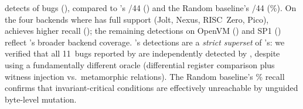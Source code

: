 \begin{table}[t]
\caption{Bug detection effectiveness across six zkVM backends. \textbf{Det.}: bugs detected; \textbf{Rec.}: recall; \textbf{TTF}: median time to first bug. \tool's detections are a strict superset of \arguzz's.}
\label{tbl:effectiveness}
\centering
{}
\end{table}

\tool detects  of  bugs (), compared to \arguzz's /44 () and the Random baseline's /44 (\%). On the four backends where \arguzz has full support (Jolt, Nexus, RISC~Zero, Pico), \tool achieves \tbd{$1.5\times$} higher recall (); the remaining detections on OpenVM () and SP1 () reflect \tool's broader backend coverage. \tool's detections are a \emph{strict superset} of \arguzz's: we verified that all 11~bugs reported by \arguzz are independently detected by \tool, despite using a fundamentally different oracle (differential register comparison plus witness injection vs.\ metamorphic relations). The Random baseline's \% recall confirms that invariant-critical conditions are effectively unreachable by unguided byte-level mutation.

